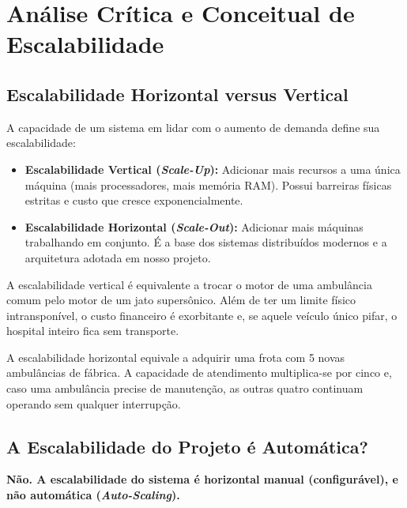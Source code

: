 \documentclass[11pt,a4paper]{article}
\begin{document}
\section{Análise Crítica e Conceitual de Escalabilidade}

\subsection{Escalabilidade Horizontal versus Vertical}

A capacidade de um sistema em lidar com o aumento de demanda define sua escalabilidade:
\begin{itemize}
    \item \textbf{Escalabilidade Vertical (\textit{Scale-Up}):} Adicionar mais recursos a uma única máquina (mais processadores, mais memória RAM). Possui barreiras físicas estritas e custo que cresce exponencialmente.
    \item \textbf{Escalabilidade Horizontal (\textit{Scale-Out}):} Adicionar mais máquinas trabalhando em conjunto. É a base dos sistemas distribuídos modernos e a arquitetura adotada em nosso projeto.
\end{itemize}

\begin{analogia}
A escalabilidade vertical é equivalente a trocar o motor de uma ambulância comum pelo motor de um jato supersônico. Além de ter um limite físico intransponível, o custo financeiro é exorbitante e, se aquele veículo único pifar, o hospital inteiro fica sem transporte.

A escalabilidade horizontal equivale a adquirir uma frota com 5 novas ambulâncias de fábrica. A capacidade de atendimento multiplica-se por cinco e, caso uma ambulância precise de manutenção, as outras quatro continuam operando sem qualquer interrupção.
\end{analogia}

\subsection{A Escalabilidade do Projeto é Automática?}

\textbf{Não. A escalabilidade do sistema é horizontal manual (configurável), e não automática (\textit{Auto-Scaling}).}
\end{document}
